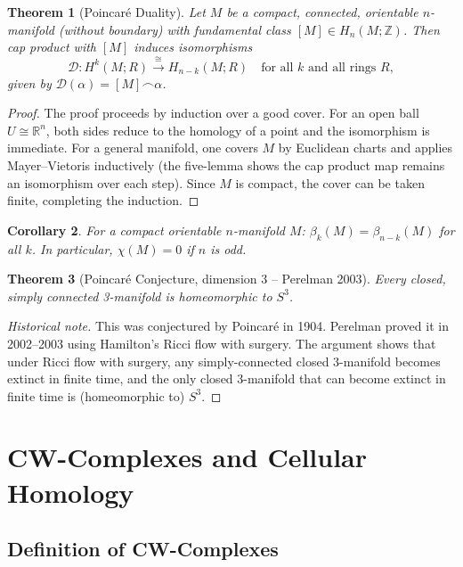 \documentclass[12pt,a4paper]{amsart}
\newtheorem{theorem}{Theorem}[section]
\newtheorem{corollary}[theorem]{Corollary}
\theoremstyle{definition}
\begin{document}
\begin{theorem}[Poincar\'e Duality]
\label{thm:poincare_duality}
Let $M$ be a compact, connected, orientable $n$-manifold (without boundary)
with fundamental class $[M] \in H_n(M;\mathbb{Z})$. Then cap product with $[M]$
induces isomorphisms
\[
  \mathcal{D}\colon H^k(M;R) \xrightarrow{\cong} H_{n-k}(M;R)
  \quad \text{for all } k \text{ and all rings } R,
\]
given by $\mathcal{D}(\alpha) = [M] \frown \alpha$.
\end{theorem}
\begin{proof}
The proof proceeds by induction over a good cover. For an open ball $U \cong \mathbb{R}^n$,
both sides reduce to the homology of a point and the isomorphism is immediate.
For a general manifold, one covers $M$ by Euclidean charts and applies Mayer--Vietoris
inductively (the five-lemma shows the cap product map remains an isomorphism over
each step). Since $M$ is compact, the cover can be taken finite, completing
the induction.
\end{proof}

\begin{corollary}
For a compact orientable $n$-manifold $M$:
$\beta_k(M) = \beta_{n-k}(M)$ for all $k$.
In particular, $\chi(M) = 0$ if $n$ is odd.
\end{corollary}

\begin{theorem}[Poincar\'e Conjecture, dimension 3 -- Perelman 2003]
\label{thm:poincare_conj}
Every closed, simply connected 3-manifold is homeomorphic to $S^3$.
\end{theorem}
\begin{proof}[Historical note]
This was conjectured by Poincar\'e in 1904. Perelman proved it in 2002--2003 using
Hamilton's Ricci flow with surgery. The argument shows that under Ricci flow with
surgery, any simply-connected closed 3-manifold becomes extinct in finite time,
and the only closed 3-manifold that can become extinct in finite time is (homeomorphic
to) $S^3$.
\end{proof}

\section{CW-Complexes and Cellular Homology}
\label{sec:cw}

\subsection{Definition of CW-Complexes}
\end{document}
